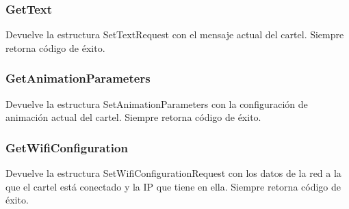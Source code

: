 \subsubsection{GetText}
Devuelve la estructura SetTextRequest con el mensaje actual del cartel.
Siempre retorna código de éxito.


\subsubsection{GetAnimationParameters}
Devuelve la estructura SetAnimationParameters con la configuración de animación actual del cartel.
Siempre retorna código de éxito.


\subsubsection{GetWifiConfiguration}
Devuelve la estructura SetWifiConfigurationRequest con los datos de la red a la que el cartel está conectado y la IP que tiene en ella.
Siempre retorna código de éxito.
